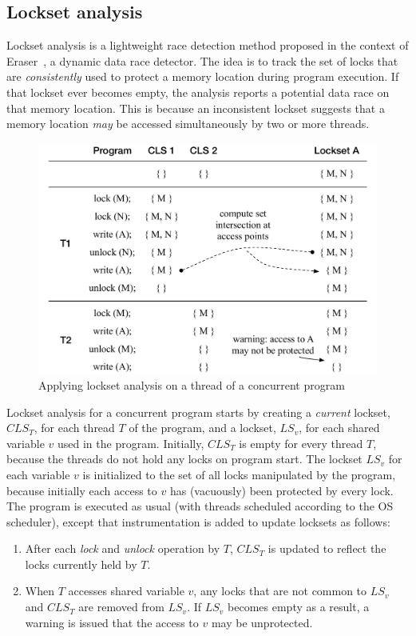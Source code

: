 \subsection{Lockset analysis}
\label{bg:lockset}

Lockset analysis is a lightweight race detection method proposed in the context of Eraser~\cite{savage1997eraser}, a dynamic data race detector.  The idea is to track the set of locks that are \emph{consistently} used to protect a memory location during program execution. If that lockset ever becomes empty, the analysis reports a potential data race on that memory location. This is because an inconsistent lockset suggests that a memory location \emph{may} be accessed simultaneously by two or more threads.  

\begin{figure}[htbp]
\centering
\includegraphics[width=1\linewidth]{img/lockset.pdf}
\caption{Applying lockset analysis on a thread of a concurrent program}
\label{fig:locksets}
\end{figure}

Lockset analysis for a concurrent program starts by creating a \emph{current} lockset, $\mathit{CLS}_T$, for each thread $T$ of the program, and a lockset, $\mathit{LS}_v$, for each shared variable $v$ used in the program. Initially, $\mathit{CLS}_T$ is empty for every thread $T$, because the threads do not hold any locks on program start. The lockset $\mathit{LS}_v$ for each variable $v$ is initialized to the set of all locks manipulated by the program, because initially each access to $v$ has (vacuously) been protected by every lock. The program is executed as usual (with threads scheduled according to the OS scheduler), except that instrumentation is added to update locksets as follows:
%
\begin{enumerate}
\item After each \emph{lock} and \emph{unlock} operation by $T$, $\mathit{CLS}_T$ is updated to reflect the locks currently held by $T$.
\item When $T$ accesses shared variable $v$, any locks that are not common to $\mathit{LS}_v$ and $\mathit{CLS}_T$ are removed from $\mathit{LS}_v$.
If $\mathit{LS}_v$ becomes empty as a result, a warning is issued that the access to $v$ may be unprotected.
\end{enumerate}

